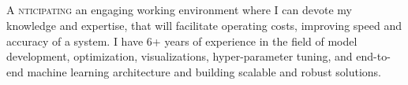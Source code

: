 \documentclass[11pt, a4paper]{article}
\begin{document}
	\begin{center}
		\textcolor{dBlue}{{\HeaderNFont \AuthorFName}\hspace{0.7cm}{\HeaderNFont \AuthorLName}} \\
		\vspace{2pt}
		{\small \textcolor{dBlue}{\CyberPresence}}
		\vspace{-23pt}
	\end{center}

	\textcolor{dBlue}{
		\\ \noindent\makebox[\linewidth]{\rule{\textwidth}{2.1pt}}
		\vspace{-21pt} \\
		\noindent\makebox[\linewidth]{\rule{\paperwidth}{3.9pt}}
		\vspace{-13pt} \\
	}

	\lettrine{\DropCaps A \hspace{1pt}}{nticipating} an engaging working environment where I can devote my knowledge and expertise, that will facilitate operating costs, improving speed and accuracy of a system. I have 6+ years of experience in the field of model development, optimization, visualizations, hyper-parameter tuning, and end-to-end machine learning architecture and building scalable and robust solutions.



	\pagebreak
	\pagebreak
\end{document}

